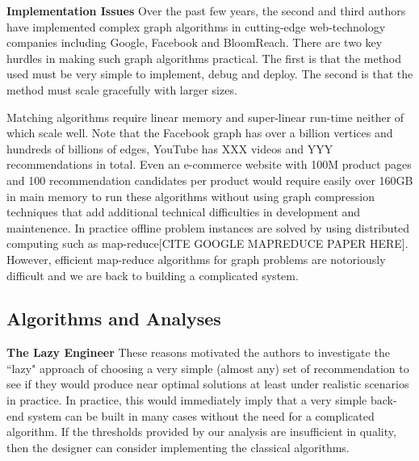 {\bf Implementation Issues} Over the past few years, the second and
third authors have implemented complex graph algorithms in
cutting-edge web-technology companies including Google, Facebook and
BloomReach. There are two key hurdles in making such graph algorithms
practical. The first is that the method used must be very simple to
implement, debug and deploy. The second is that the method must scale
gracefully with larger sizes. \vs

Matching algorithms require linear memory and super-linear run-time
neither of which scale well. Note that the Facebook graph has over a
billion vertices\cite{} and hundreds of billions of edges\cite{},
YouTube has XXX videos and YYY recommendations\cite{} in total. Even an
e-commerce website with 100M product pages and 100 recommendation candidates per
product would require easily over 160GB in main memory to run these
algorithms without using graph compression techniques that add additional technical difficulties
in development and maintenence. In practice offline problem instances are solved by using
distributed computing such as map-reduce[CITE GOOGLE MAPREDUCE PAPER HERE]. 
However, efficient map-reduce algorithms for graph problems
are notoriously difficult and we are back to building a complicated
system. \vs


\subsection{Algorithms and Analyses}

{\bf The Lazy Engineer} These reasons motivated the authors to
investigate the ``lazy" approach of choosing a very simple (almost
any) set of recommendation to see if they would produce near optimal
solutions at least under realistic scenarios in practice.  In
practice, this would immediately imply that a very simple back-end
system can be built in many cases without the need for a complicated
algorithm. If the thresholds provided by our analysis are insufficient
in quality, then the designer can consider implementing the classical
algorithms. \vs

